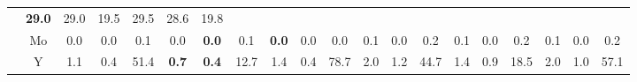 \documentclass[french,10pt]{article}
\begin{document}
\begin{landscape}
\begin{longtable}{ l  c | c c c | c c c | c c c | c c c | c c c | c c c | }
    
                    &                     \textbf{ 29.0}
     & {\footnotesize     29.0
    } & {\footnotesize     19.5
     }
    
    
                    &                     29.5
     & {\footnotesize     28.6
    } & {\footnotesize     19.8
     }
    
    
                    \\*
                        & {\small Mo  }

                    &                     0.0
     & {\footnotesize     0.0
    } & {\footnotesize     0.1
     }
    
    
                    &                     0.0
     & {\footnotesize     \textbf{ 0.0}
    } & {\footnotesize     0.1
     }
    
    
                    &                     \textbf{ 0.0}
     & {\footnotesize     0.0
    } & {\footnotesize     0.0
     }
    
    
                    &                     0.1
     & {\footnotesize     0.0
    } & {\footnotesize     0.2
     }
    
    
                    &                     0.1
     & {\footnotesize     0.0
    } & {\footnotesize     0.2
     }
    
    
                    &                     0.1
     & {\footnotesize     0.0
    } & {\footnotesize     0.2
     }
    
    
                    \\*
                        & {\small Y  }

                    &                     1.1
     & {\footnotesize     0.4
    } & {\footnotesize     51.4
     }
    
    
                    &                     \textbf{ 0.7}
     & {\footnotesize     \textbf{ 0.4}
    } & {\footnotesize     12.7
     }
    
    
                    &                     1.4
     & {\footnotesize     0.4
    } & {\footnotesize     78.7
     }
    
    
                    &                     2.0
     & {\footnotesize     1.2
    } & {\footnotesize     44.7
     }
    
    
                    &                     1.4
     & {\footnotesize     0.9
    } & {\footnotesize     18.5
     }
    
    
                    &                     2.0
     & {\footnotesize     1.0
    } & {\footnotesize     57.1
     }
    

\end{longtable}
\end{landscape}
\end{document}
